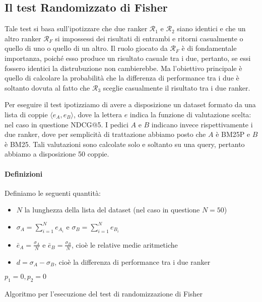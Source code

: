 \subsection{Il test Randomizzato di Fisher}
Tale test si basa sull'ipotizzare che due ranker $\mathcal{R}_1 $ e $\mathcal{R}_2$ siano identici
e che un altro ranker $\mathcal{R}_F$ si impossessi dei risultati di entrambi e
ritorni casualmente o quello di uno o quello di un altro.
Il ruolo giocato da $\mathcal{R}_F$ è di fondamentale importanza, poiché esso produce un risultato
casuale tra i due, pertanto, se essi fossero identici la distrubuzione non cambierebbe.
Ma l'obiettivo principale è quello di calcolare la probabilità che la differenza
di performance tra i due è soltanto dovuta al fatto che $\mathcal{R}_3$ sceglie casualmente
il risultato tra i due ranker.

Per eseguire il test ipotizziamo di avere a disposizione un dataset formato da una lista
di coppie $\langle e_{A}, e_{B}\rangle$, dove la lettera $e$ indica la funzione di valutazione
scelta: nel caso in questione NDCG@5. I pedici $A$ e $B$ indicano invece rispettivamente i due
ranker, dove per semplicità di trattazione abbiamo posto che $A$ è BM25P e $B$ è BM25. Tali valutazioni sono calcolate solo e soltanto su una query,
pertanto abbiamo a disposizione 50 coppie.

\paragraph{Definizioni}
Definiamo le seguenti quantità:

\begin{itemize}
	\item $N$ la lunghezza della lista del dataset (nel caso in questione $N=50$)
	\item $\sigma_A = \sum_{i=1}^{N} e_{A_i}$ e $\sigma_B = \sum_{i=1}^{N} e_{B_i}$
	\item $\bar{e}_A = \frac{\sigma_{A} }{N}$ e  $\bar{e}_B = \frac{\sigma_{B} }{N}$, cioè le relative medie aritmetiche
	\item $d = \sigma_{A} - \sigma_{B}$, cioè la differenza di performance tra i due ranker
\end{itemize}


\begin{algorithm}[h!]
	\small
	\DontPrintSemicolon
	\BlankLine
	$p_1 = 0, p_2 = 0$\;
	\BlankLine
	
	\label{alg:spectest}
	\caption{Algoritmo per l'esecuzione del test di randomizzazione di Fisher}
\end{algorithm}

